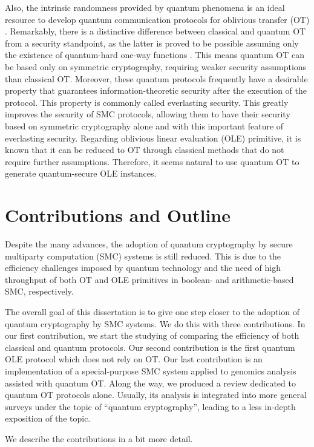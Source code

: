 Also, the intrinsic randomness provided by quantum phenomena is an ideal resource to develop quantum communication protocols for oblivious transfer (OT) \cite{BBCS92}. Remarkably, there is a distinctive difference between classical and quantum OT from a security standpoint, as the latter is proved to be possible assuming only the existence of quantum-hard one-way functions \cite{GLSV21, BCKM21}. This means quantum OT can be based only on symmetric cryptography, requiring weaker security assumptions than classical OT. Moreover, these quantum protocols frequently have a desirable property that guarantees information-theoretic security after the execution of the protocol. This property is commonly called everlasting security. This greatly improves the security of SMC protocols, allowing them to have their security based on symmetric cryptography alone and with this important feature of everlasting security. Regarding oblivious linear evaluation (OLE) primitive, it is known that it can be reduced to OT \cite{KOS16} through classical methods that do not require further assumptions. Therefore, it seems natural to use quantum OT to generate quantum-secure OLE instances.


\section*{Contributions and Outline} %

Despite the many advances, the adoption of quantum cryptography by secure multiparty computation (SMC) systems is still reduced. This is due to the efficiency challenges imposed by quantum technology and the need of high throughput of both OT and OLE primitives in boolean- and arithmetic-based SMC, respectively.

The overall goal of this dissertation is to give one step closer to the adoption of quantum cryptography by SMC systems. We do this with three contributions. In our first contribution, we start the studying of comparing the efficiency of both classical and quantum protocols. Our second contribution is the first quantum OLE protocol which does not rely on OT. Our last contribution is an implementation of a special-purpose SMC system applied to genomics analysis assisted with quantum OT. Along the way, we produced a review dedicated to quantum OT protocols alone. Usually, its analysis is integrated into more general surveys under the topic of “quantum cryptography”, leading to a less in-depth exposition of the topic.

We describe the contributions in a bit more detail.

